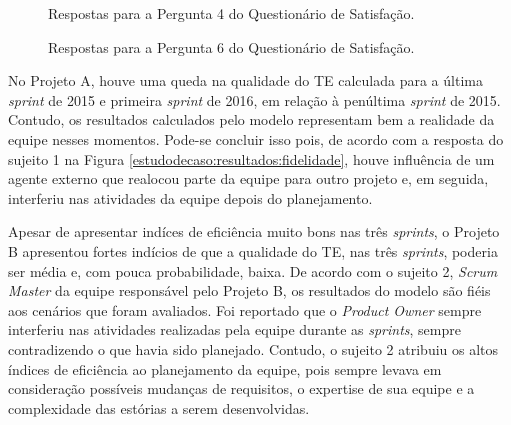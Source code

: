 \begin{figure}[H]
\begin{center}
	\end{center}
	\caption{Respostas para a Pergunta 4 do Questionário de Satisfação.}
	\label{estudodecaso:resultados:respostasAuxilio}
\end{figure}

\begin{figure}[H]
\begin{center}
	\end{center}
	\caption{Respostas para a Pergunta 6 do Questionário de Satisfação.}
	\label{estudodecaso:resultados:respostasUtilizacao}
\end{figure}

No Projeto A, houve uma queda na qualidade do TE calculada para a última \textit{sprint} de 2015 e primeira \textit{sprint} de 2016, em relação à penúltima \textit{sprint} de 2015. Contudo, os resultados calculados pelo modelo representam bem a realidade da equipe nesses momentos. Pode-se concluir isso pois, de acordo com a resposta do sujeito 1 na Figura \ref{estudodecaso:resultados:fidelidade}, houve influência de um agente externo que realocou parte da equipe para outro projeto e, em seguida, interferiu nas atividades da equipe depois do planejamento.

Apesar de apresentar indíces de eficiência muito bons nas três \textit{sprints}, o Projeto B apresentou fortes indícios de que a qualidade do TE, nas três \textit{sprints}, poderia ser média e, com pouca probabilidade, baixa. De acordo com o sujeito 2, \textit{Scrum Master} da equipe responsável pelo Projeto B, os resultados do modelo são fiéis aos cenários que foram avaliados. Foi reportado que o \textit{Product Owner} sempre interferiu nas atividades realizadas pela equipe durante as \textit{sprints}, sempre contradizendo o que havia sido planejado. Contudo, o sujeito 2 atribuiu os altos índices de eficiência ao planejamento da equipe, pois sempre levava em consideração possíveis mudanças de requisitos, o expertise de sua equipe e a complexidade das estórias a serem desenvolvidas.

